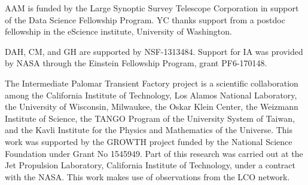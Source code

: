 \documentclass[twocolumn]{aastex61}
\begin{document}
AAM is funded by the Large Synoptic Survey Telescope Corporation in support of the Data Science Fellowship Program. YC thanks support from a postdoc fellowship in the eScience institute, University of Washington.

DAH, CM, and GH are supported by NSF-1313484. Support for IA was provided by NASA through the Einstein Fellowship Program, grant PF6-170148.

The Intermediate Palomar Transient Factory project is a scientific collaboration among the California Institute of Technology, Los Alamos National Laboratory, the University of Wisconsin, Milwaukee, the Oskar Klein Center, the Weizmann Institute of Science, the TANGO Program of the University System of Taiwan, and the Kavli Institute for the Physics and Mathematics of the Universe. This work was supported by the GROWTH project funded by the National Science Foundation under Grant No 1545949. Part of this research was carried out at the Jet Propulsion Laboratory, California Institute of Technology, under a contract with the NASA. This work makes use of observations from the LCO network.




\end{document}
